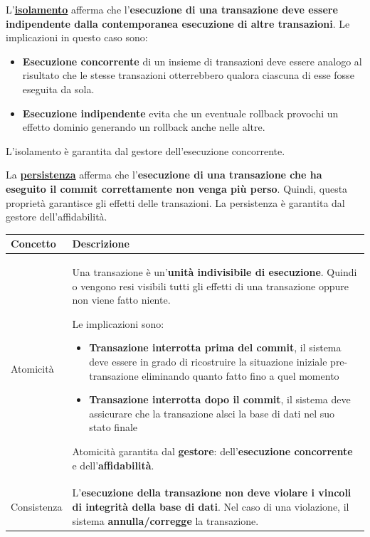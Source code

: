 \documentclass[a4paper]{article}
\begin{document}
\begin{enumerate}
		L'\textbf{\underline{isolamento}} afferma che l'\textbf{esecuzione di una transazione deve essere indipendente dalla contemporanea esecuzione di altre transazioni}. Le implicazioni in questo caso sono:
		\begin{itemize}
			\item \textbf{Esecuzione concorrente} di un insieme di transazioni deve essere analogo al risultato che le stesse transazioni otterrebbero qualora ciascuna di esse fosse eseguita da sola.
			
			\item \textbf{Esecuzione indipendente} evita che un eventuale \textsf{rollback} provochi un effetto dominio generando un \textsf{rollback} anche nelle altre.
		\end{itemize}
		L'isolamento è garantita dal gestore dell'esecuzione concorrente.\newline
		
		La \textbf{\underline{persistenza}} afferma che l'\textbf{esecuzione di una transazione che ha eseguito il \textsf{commit} correttamente non venga più perso}. Quindi, questa proprietà garantisce gli effetti delle transazioni. La persistenza è garantita dal gestore dell'affidabilità.
		
		\begin{table}[!htp]
			\centering
			\begin{tabular}{@{} l p{23em} @{}}
				\toprule
				Concetto & Descrizione \\
				\midrule
				Atomicità & Una transazione è un'\textbf{unità indivisibile di esecuzione}. Quindi o vengono resi visibili tutti gli effetti di una transazione oppure non viene fatto niente.
				
				Le implicazioni sono:
				\begin{itemize}
					\item \textbf{Transazione interrotta prima del commit}, il sistema deve essere in grado di ricostruire la situazione iniziale pre-transazione eliminando quanto fatto fino a quel momento
					
					\item \textbf{Transazione interrotta dopo il commit}, il sistema deve assicurare che la transazione alsci la base di dati nel suo stato finale
				\end{itemize}
				Atomicità garantita dal \textbf{gestore}: dell'\textbf{esecuzione concorrente} e dell'\textbf{affidabilità}. \\ [.7em]
				Consistenza & L'\textbf{esecuzione della transazione non deve violare i vincoli di integrità della base di dati}. Nel caso di una violazione, il sistema \textbf{annulla/corregge} la transazione. 
				

\end{tabular}
\end{table}
\end{enumerate}
\end{document}
